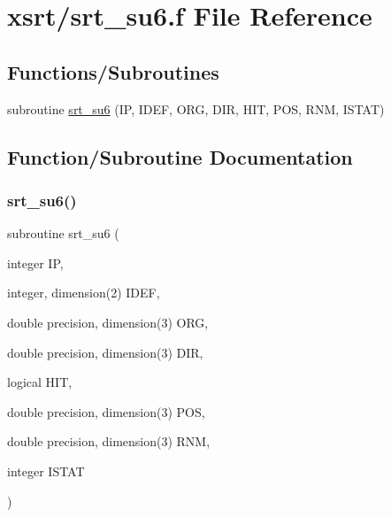 \hypertarget{srt__su6_8f}{}\section{xsrt/srt\+\_\+su6.f File Reference}
\label{srt__su6_8f}
\subsection*{Functions/\+Subroutines}
\begin{DoxyCompactItemize}
\item 
subroutine \hyperlink{srt__su6_8f_abfdbe12523dc6a543611fcf32b0067d7}{srt\+\_\+su6} (IP, I\+D\+EF, O\+RG, D\+IR, H\+IT, P\+OS, R\+NM, I\+S\+T\+AT)
\end{DoxyCompactItemize}


\subsection{Function/\+Subroutine Documentation}
\mbox{\label{srt__su6_8f_abfdbe12523dc6a543611fcf32b0067d7}} 
\subsubsection{\texorpdfstring{srt\+\_\+su6()}{srt\_su6()}}
{\footnotesize\ttfamily subroutine srt\+\_\+su6 (\begin{DoxyParamCaption}\item[{integer}]{IP,  }\item[{integer, dimension(2)}]{I\+D\+EF,  }\item[{double precision, dimension(3)}]{O\+RG,  }\item[{double precision, dimension(3)}]{D\+IR,  }\item[{logical}]{H\+IT,  }\item[{double precision, dimension(3)}]{P\+OS,  }\item[{double precision, dimension(3)}]{R\+NM,  }\item[{integer}]{I\+S\+T\+AT }\end{DoxyParamCaption})}

